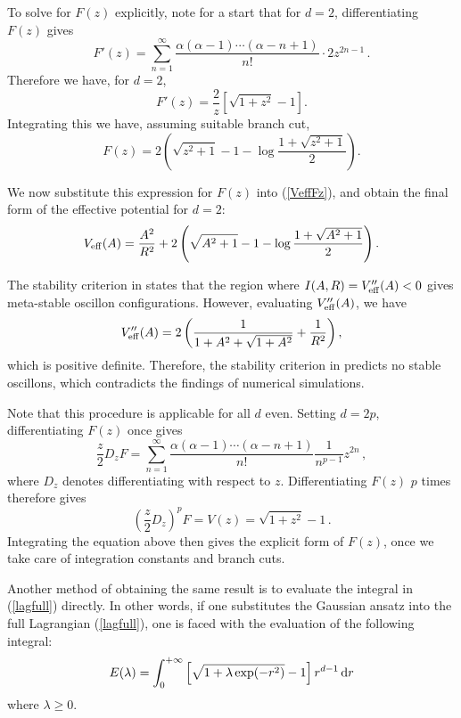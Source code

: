 \documentclass[11pt]{book}
\begin{document}
To solve for $F(z)$ explicitly, note for a start that for $d=2$, differentiating $F(z)$ gives
\begin{equation}
  F'(z)=\sum_{n=1}^\infty\frac{\alpha(\alpha-1)\cdots(\alpha-n+1)}{n!} \cdot 2 z^{2n-1}\,.
\end{equation}
Therefore we have, for $d=2$,
\begin{equation}
  F'(z)=\frac{2}{z}\left[\sqrt{1+z^2}-1\right].
\end{equation}
Integrating this we have, assuming suitable branch cut,
\begin{equation}
  F(z) = 2 \left(\sqrt{z^2+1}-1-\log \frac{1+\sqrt{z^2+1}}{2}\right).
\end{equation}

We now substitute this expression for $F(z)$ into (\ref{VeffFz}), and obtain the final form of the effective potential for $d=2$:
\begin{equation}
  V_{\rm eff}(A) = \frac{A^2}{R^2} + 2 \left(\sqrt{A^2+1}-1-\log \frac{1+\sqrt{A^2+1}}{2}\right).
\end{equation}

The stability criterion in \cite{Gleiser:2008ty} states that the region where $I(A,R) = V''_{\rm eff}(A)<0$ gives meta-stable oscillon configurations. However, evaluating $V''_{\rm eff}(A)$, we have
\begin{equation}
  V''_{\rm eff}(A) = 2 \left(\frac{1}{1 + A^2 + \sqrt{1 + A^2}} + \frac{1}{R^2}\right),
\end{equation}
which is positive definite. Therefore, the stability criterion in \cite{Gleiser:2008ty} predicts no stable oscillons, which contradicts the findings of numerical simulations.

Note that this procedure is applicable for all $d$ even. Setting $d=2p$, differentiating $F(z)$ once gives
\begin{equation}
  \frac{z}{2}D_z F = \sum_{n=1}^\infty\frac{\alpha(\alpha-1)\cdots(\alpha-n+1)}{n!} \frac{1}{n^{p-1}} z^{2n}\,,
\end{equation}
where $D_z$ denotes differentiating with respect to $z$. Differentiating $F(z)$ $p$ times therefore gives
\begin{equation}
  \left(\frac{z}{2}D_z\right)^p F = V(z) = \sqrt{1+z^2}-1\,.
\end{equation}
Integrating the equation above then gives the explicit form of $F(z)$, once we take care of integration constants and branch cuts.

Another method of obtaining the same result is to evaluate the integral in (\ref{lagfull}) directly. In other words, if one substitutes the Gaussian ansatz into the full Lagrangian (\ref{lagfull}), one is faced with the evaluation of the following integral:
\begin{equation}\label{intE}
  E(\lambda) = \int^{+\infty}_0 \left[\sqrt{1+\lambda\exp(-r^2)} -1\right]r^{d-1}\,{\rm d}r
\end{equation}
where $\lambda \ge 0$.%
\end{document}
